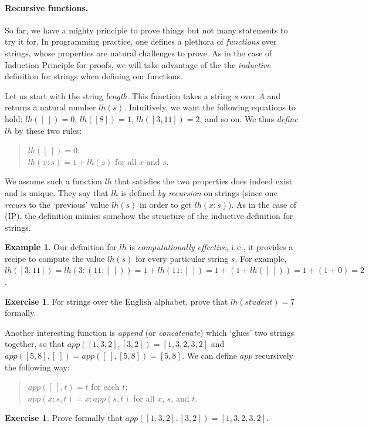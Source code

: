 \documentclass[12pt,notitlepage]{article}
\theoremstyle{plain}
\theoremstyle{definition}
\newtheorem{exc}[thm]{Exercise}
\newtheorem{exm}[thm]{Example}
\theoremstyle{plain}
\newcommand{\1}{\mathbf{1}}
\newcommand{\0}{\mathbf{0}}
\newcommand{\mcomm}[1]{}
\begin{document}
\paragraph{Recursive functions.} So far, we have a mighty principle to prove things but not many statements to try it for. In programming practice, one defines a plethora of \emph{functions} over strings, whose properties are natural challenges to prove. As in the case of Induction Principle for proofs, we will take advantage of the the \emph{inductive} definition for strings when defining our functions.

Let us start with the string \emph{length}. This function takes a string $s$ over $A$ and returns a natural number $lh(s)$. Intuitively, we want the following equations to hold: $lh([\ ]) = 0$, $lh([8]) = 1$, $lh([3,11]) = 2$, and so on. We thus \emph{define} $lh$ by these two rules:
\begin{quote}
$lh([\ ]) = 0$;\\
$lh(x : s) = 1 + lh(s)$ for all $x$ and $s$.
\end{quote}
We assume such a function $lh$ that satisfies the two properties does indeed exist and is unique. They say that $lh$ is defined \emph{by recursion} on strings (since one \emph{recurs} to the `previous' value $lh(s)$ in order to get $lh(x: s)$). As in the case of (IP), the definition mimics somehow the structure of the inductive definition for strings.

\mcomm{It is easy to prove the uniqueness by IP application but the existence would likely require some `set-theoretic' considerations, which we want to avoid here.}

\begin{exm}
Our definition for $lh$ is \emph{computationally effective}, i.\,e., it provides a recipe to compute the value $lh(s)$ for every particular string $s$. For example, $lh([3,11]) = lh (3:(11:[\ ])) = 1 + lh (11:[\ ]) = 1 + (1 + lh([\ ])) = 1 + (1 + 0) = 2$.
\end{exm}

\begin{exc}
For strings over the English alphabet, prove that $lh(student) = 7$ formally.
\end{exc}

Another interesting function is \emph{append} (or \emph{concatenate}) which `glues' two strings together, so that $app([1,3,2],[3,2]) = [1,3,2,3,2]$ and $app([5,8], [\ ]) = app([\ ], [5,8]) = [5, 8]$. We can define $app$ recursively the following way:
\begin{quote}
$app([\ ], t) = t$ for each $t$;\\
$app(x : s, t) = x : app(s, t)$ for all $x$, $s$, and $t$.
\end{quote}
\begin{exc}
Prove formally that $app([1,3,2],[3,2]) = [1,3,2,3,2]$.
\end{exc}
\end{document}

